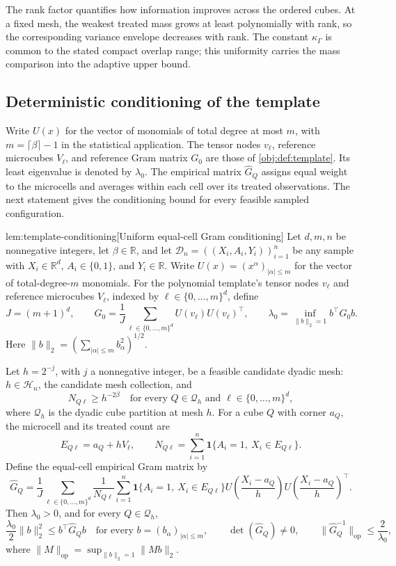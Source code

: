 The rank factor quantifies how information improves across the ordered cubes. At a fixed mesh, the weakest treated mass grows at least polynomially with rank, so the corresponding variance envelope decreases with rank. The constant \(\kappa_\Gamma\) is common to the stated compact overlap range; this uniformity carries the mass comparison into the adaptive upper bound.

\subsection{Deterministic conditioning of the template}

Write \(U(x)\) for the vector of monomials of total degree at most \(m\), with \(m=\lceil\beta\rceil-1\) in the statistical application. The tensor nodes \(v_\ell\), reference microcubes \(V_\ell\), and reference Gram matrix \(G_0\) are those of \cref{obj:def:template}. Its least eigenvalue is denoted by \(\lambda_0\). The empirical matrix \(\widehat G_Q\) assigns equal weight to the microcells and averages within each cell over its treated observations. The next statement gives the conditioning bound for every feasible sampled configuration.

\begin{lemmav}{lem:template-conditioning}[Uniform equal-cell Gram conditioning]
Let \(d,m,n\) be nonnegative integers, let \(\beta\in\mathbb R\), and let \(\mathcal D_n=((X_i,A_i,Y_i))_{i=1}^n\) be any sample with \(X_i\in\mathbb R^d\), \(A_i\in\{0,1\}\), and \(Y_i\in\mathbb R\). Write \(U(x)=(x^\alpha)_{|\alpha|\le m}\) for the vector of total-degree-\(m\) monomials. For the polynomial template's tensor nodes \(v_\ell\) and reference microcubes \(V_\ell\), indexed by \(\ell\in\{0,\ldots,m\}^d\), define
\[
J=(m+1)^d,\qquad
G_0=\frac1J\sum_{\ell\in\{0,\ldots,m\}^d}
U(v_\ell)U(v_\ell)^\top,\qquad
\lambda_0=\inf_{\|b\|_2=1}b^\top G_0b.
\]
Here \(\|b\|_2=(\sum_{|\alpha|\le m}b_\alpha^2)^{1/2}\).

Let \(h=2^{-j}\), with \(j\) a nonnegative integer, be a feasible candidate dyadic mesh: \(h\in\mathcal H_n\), the candidate mesh collection, and
\[
N_{Q\ell}\ge h^{-2\beta}
\quad\text{for every }Q\in\mathcal Q_h
\text{ and }\ell\in\{0,\ldots,m\}^d,
\]
where \(\mathcal Q_h\) is the dyadic cube partition at mesh \(h\). For a cube \(Q\) with corner \(a_Q\), the microcell and its treated count are
\[
E_{Q\ell}=a_Q+hV_\ell,\qquad
N_{Q\ell}=\sum_{i=1}^n
\mathbf1\{A_i=1,\ X_i\in E_{Q\ell}\}.
\]
Define the equal-cell empirical Gram matrix by
\[
\widehat G_Q
=\frac1J\sum_{\ell\in\{0,\ldots,m\}^d}
\frac1{N_{Q\ell}}
\sum_{i=1}^n
\mathbf1\{A_i=1,\ X_i\in E_{Q\ell}\}
U\!\left(\frac{X_i-a_Q}{h}\right)
U\!\left(\frac{X_i-a_Q}{h}\right)^\top.
\]
Then \(\lambda_0>0\), and for every \(Q\in\mathcal Q_h\),
\[
\frac{\lambda_0}{2}\|b\|_2^2
\le b^\top\widehat G_Qb
\quad\text{for every }b=(b_\alpha)_{|\alpha|\le m},
\qquad
\det(\widehat G_Q)\ne0,
\qquad
\|\widehat G_Q^{-1}\|_{\mathrm{op}}
\le\frac2{\lambda_0},
\]
where \(\|M\|_{\mathrm{op}}=\sup_{\|b\|_2=1}\|Mb\|_2\).
\end{lemmav}

